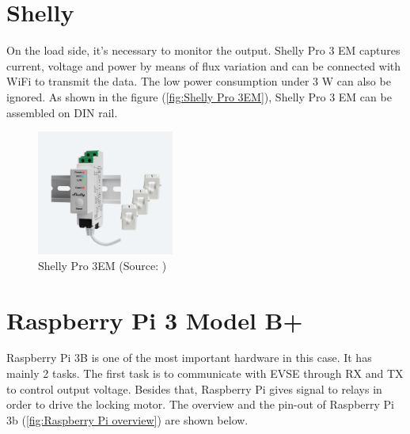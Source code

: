 \documentclass[
english,
ruledheaders=section,%
class=report,%
thesis={type=Report},%
accentcolor=9c,%
custommargins=true,%
marginpar=false,%
parskip=half-,%
fontsize=11pt,%
logofile={img/tuda_logo.pdf}, %
]{tudapub}
\begin{document}
    \section{Shelly}


    On the load side, it's necessary to monitor the output. Shelly Pro 3 EM captures current, voltage and power by means of flux variation and can be connected with WiFi to transmit the data. The low power consumption under 3 W can also be ignored.\cite{Shelly} As shown in the figure (\autoref{fig:Shelly Pro 3EM}), Shelly Pro 3 EM can be assembled on DIN rail.


    \begin{figure}[htbp]
        \centering
        \includegraphics[width=0.4\textwidth]{img/Shelly Pro 3EM.jpg} %
        \caption{Shelly Pro 3EM
            (Source: \cite{Shelly})}
        \label{fig:Shelly Pro 3EM}
    \end{figure}



    \section{Raspberry Pi 3 Model B+}
    \label{sec:RaspberryIntroduction}

    Raspberry Pi 3B is one of the most important hardware in this case. It has mainly 2 tasks. The first task is to communicate with EVSE through RX and TX to control output voltage. Besides that, Raspberry Pi gives signal to relays in order to drive the locking motor. The overview and the pin-out of Raspberry Pi 3b (\autoref{fig:Raspberry Pi overview}) are shown below.
\end{document}
